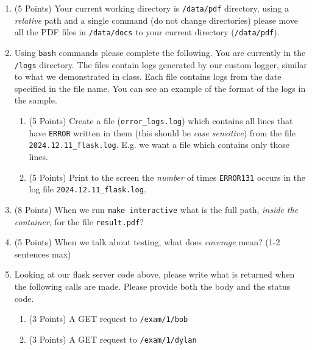 \documentclass[11pt]{article}
\begin{document}
\begin{enumerate}

\item (5 Points) Your current working directory is \texttt{/data/pdf} directory, using a \emph{relative} path and a single command (do not change directories) please move all the PDF files in \texttt{/data/docs} to your current directory (\texttt{/data/pdf}).

\vspace{5cm}

\item Using \texttt{bash} commands please complete the following. You are currently in the \texttt{/logs} directory. The files contain logs generated by our custom logger, similar to what we demonstrated in class. Each file contains logs from the date specified in the file name. You can see an example of the format of the logs in the sample.
\begin{enumerate}
	\item (5 Points) Create a file (\texttt{error\_logs.log}) which contains all lines that have \texttt{ERROR} written in them (this should be \emph{case sensitive}) from the file \texttt{2024.12.11\_flask.log}. E.g. we want a file which contains only those lines. 
\vspace{5cm}
	\item (5 Points) Print to the screen the \emph{number} of times \texttt{ERROR131} occurs in the log file \texttt{2024.12.11\_flask.log}.
\vspace{5cm}

\end{enumerate}

\item (8 Points) When we run \texttt{make interactive} what is the full path, \emph{inside the container}, for the file \texttt{result.pdf}?

\vspace{2cm}

\item (5 Points) When we talk about testing, what does \emph{coverage} mean? (1-2 sentences max)

\vspace{5cm}

\newpage

\item Looking at our flask server code above, please write what is returned when the following calls are made. Please provide both the body and the status code.


\begin{enumerate}
\item (3 Points) A GET request to \texttt{/exam/1/bob}
\vspace{4cm}
\item (3 Points) A GET request to \texttt{/exam/1/dylan}
\vspace{4cm}
\end{enumerate}




\end{enumerate}
\end{document}
